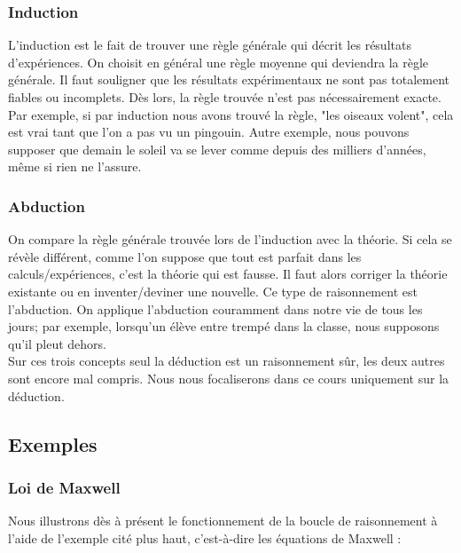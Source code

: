 \subsubsection{Induction}

L'induction est le fait de trouver une règle générale qui décrit les résultats d'expériences. On choisit en général une règle moyenne qui deviendra la règle générale.  Il faut souligner que les résultats expérimentaux ne sont pas totalement fiables ou incomplets. Dès lors, la règle trouvée n'est pas nécessairement exacte.  Par exemple, si par induction nous avons trouvé la règle, "les oiseaux volent", cela est vrai tant que l'on a pas vu un pingouin. Autre exemple, nous pouvons supposer que demain le soleil va se lever comme depuis des milliers d'années, même si rien ne l'assure.\\

\subsubsection{Abduction}

On compare la règle générale trouvée lors de l'induction avec la théorie. Si cela se révèle différent, comme l'on suppose que tout est parfait dans les calculs/expériences, c'est la théorie qui est fausse. Il faut alors corriger la théorie existante ou en inventer/deviner une nouvelle. Ce type de raisonnement est l'abduction. On applique l'abduction couramment dans notre vie de tous les jours; par exemple, lorsqu'un élève entre trempé dans la classe, nous supposons qu'il pleut dehors. \\


Sur ces trois concepts seul la déduction est un raisonnement sûr, les deux autres sont encore mal compris. Nous nous focaliserons dans ce cours uniquement sur la déduction. \\


\subsection{Exemples}

\subsubsection{Loi de Maxwell}

Nous illustrons dès à présent le fonctionnement de la boucle de raisonnement à l'aide de l'exemple cité plus haut, c'est-à-dire les équations de Maxwell :

